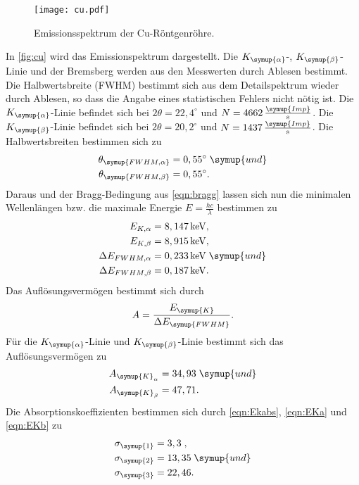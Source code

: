 \begin{figure}
  \centering
  \texttt{[image: cu.pdf]}
  \caption{Emissionsspektrum der Cu-Röntgenröhre.}
  \label{fig:cu}
\end{figure}
In \autoref{fig:cu} wird das Emissionspektrum dargestellt. Die $K_{\symup{\alpha}}$-, $K_{\symup{\beta}}$-Linie und
der Bremsberg werden aus den Messwerten durch Ablesen bestimmt. Die Halbwertsbreite (FWHM) bestimmt sich aus dem
Detailspektrum wieder durch Ablesen, so dass die Angabe eines statistischen Fehlers nicht nötig ist.
Die $K_{\symup{\alpha}}$-Linie befindet sich bei $2\theta=22,4^{\circ}$ und 
$N = 4662\,\frac{\symup{Imp}}{\unit{\second}}$. Die $K_{\symup{\beta}}$-Linie befindet sich bei 
$2\theta=20,2^{\circ}$ und $N = 1437\,\frac{\symup{Imp}}{\unit{\second}}$. Die Halbwertsbreiten bestimmen sich zu
\begin{align*}
  \theta_{\symup{FWHM, \alpha}} &= 0,55^{\circ} \; \symup{und} \\
  \theta_{\symup{FWHM, \beta}} &= 0,55^{\circ}. 
\end{align*}
Daraus und der Bragg-Bedingung aus \autoref{eqn:bragg} lassen sich nun die minimalen Wellenlängen bzw.
die maximale Energie $E = \frac{hc}{\lambda}$ bestimmen zu
\begin{align*}
  E_{K,\alpha}           &= 8,147\,\unit{\kilo\eV},\\
  E_{K, \beta}           &= 8,915\,\unit{\kilo\eV},\\
  \Delta E_{FWHM,\alpha} &= 0,233\,\unit{\kilo\eV} \; \symup{und}\\
  \Delta E_{FWHM,\beta}  &= 0,187\,\unit{\kilo\eV}.
\end{align*}
Das Auflösungsvermögen bestimmt sich durch
\begin{align*}
  A = \frac{E_{\symup{K}}}{\Delta E_{\symup{FWHM}}}.
\end{align*}
Für die $K_{\symup{\alpha}}$-Linie und $K_{\symup{\beta}}$-Linie bestimmt sich das Auflösungsvermögen zu
\begin{align*}
  A_{\symup{K}_{\alpha}}  &=  34,93 \; \symup{und}\\
  A_{\symup{K}_{\beta}}   &= 47,71.
\end{align*}
Die Absorptionskoeffizienten bestimmen sich durch \autoref{eqn:Ekabs}, \autoref{eqn:EKa} und
\autoref{eqn:EKb} zu
\begin{align*}
  \sigma_{\symup{1}} &= 3,3\;,\\
  \sigma_{\symup{2}} &= 13,35\; \symup{und}\\
  \sigma_{\symup{3}} &= 22,46.
\end{align*}

